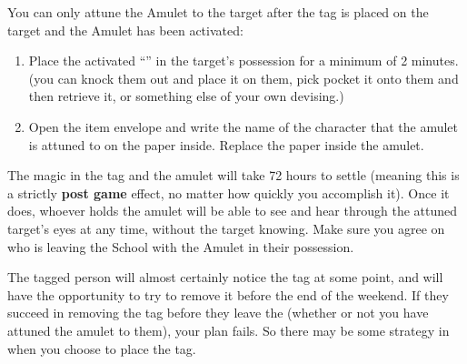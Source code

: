 \documentclass[green]{GL2020}
\begin{document}
You can only attune the Amulet to the target after the tag is placed on the target and the Amulet has been activated:
\begin{enumerate}
  \item Place the activated ``\iScryingAmulet{}'' in the target’s possession for a minimum of 2 minutes. (you can knock them out and place it on them, pick pocket it onto them and then retrieve it, or something else of your own devising.)
  \item Open the \iScryingAmulet{} item envelope and write the name of the character that the amulet is attuned to on the paper inside. Replace the paper inside the amulet.
\end{enumerate}

The magic in the tag and the amulet will take 72 hours to settle (meaning this is a strictly \textbf{post game} effect, no matter how quickly you accomplish it). Once it does, whoever holds the amulet will be able to see and hear through the attuned target’s eyes at any time, without the target knowing. Make sure you agree on who is leaving the School with the Amulet in their possession.

The tagged person will almost certainly notice the tag at some point, and will have the opportunity to try to remove it before the end of the weekend. If they succeed in removing the tag before they leave the \pSc{} (whether or not you have attuned the amulet to them), your plan fails. So there may be some strategy in when you choose to place the tag.
\end{document}
